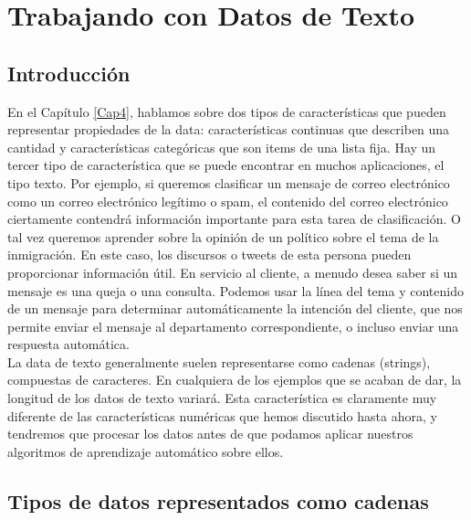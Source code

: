 

	
% 	

\chapter{Trabajando con Datos de Texto}\label{Cap7}


\section{Introducción}

En el Capítulo \ref{Cap4}, hablamos sobre dos tipos de características que pueden representar 
propiedades de la data: características continuas que describen una cantidad y características categóricas que son items  de una lista fija. Hay un tercer tipo de característica que se puede encontrar en muchos
aplicaciones,  el tipo  texto.  Por ejemplo, si queremos clasificar un mensaje de correo electrónico como
 un correo electrónico legítimo o spam, el contenido del correo electrónico ciertamente contendrá
información importante para esta tarea de clasificación.  O tal vez queremos aprender sobre la opinión de un político sobre el tema de la inmigración.  En este caso, los discursos o tweets de esta persona pueden proporcionar información útil.   En servicio al cliente, a menudo desea saber si un mensaje es una queja o una consulta.   Podemos usar la línea del tema y contenido de un mensaje para determinar automáticamente la intención del cliente, que nos permite enviar el mensaje al departamento correspondiente, o incluso enviar una  respuesta automática.\\


La data de texto generalmente  suelen representarse como cadenas (strings), compuestas de caracteres. En cualquiera de los ejemplos que se acaban de dar, la longitud de los datos de texto variará. Esta característica es claramente muy diferente de las características numéricas que hemos discutido hasta ahora, y tendremos que procesar los datos antes de que podamos aplicar nuestros algoritmos de aprendizaje automático sobre ellos.\\


\section{Tipos de datos representados como cadenas}

